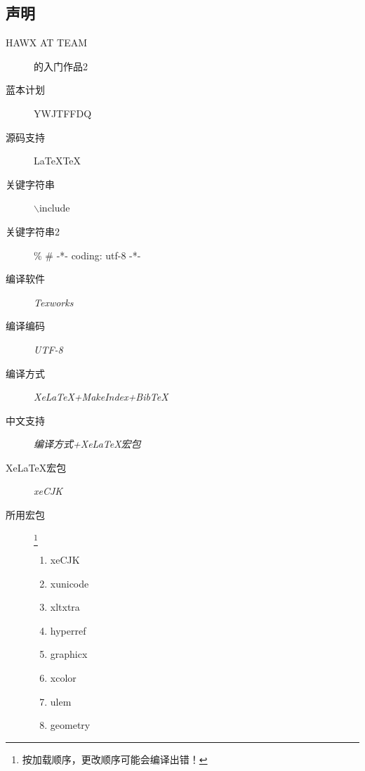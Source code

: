 ﻿%
\subsection{声明}
\begin{description}
\item[HAWX AT TEAM]的入门作品2
\item[蓝本计划]YWJTFFDQ
\item[源码支持]\XeTeX \LaTeXe  \LaTeX  \TeX
\item[关键字符串]$\backslash$include
\item[关键字符串2]\% \# -*- coding: utf-8 -*-
\item[编译软件]\emph{Texworks}
\item[编译编码]\emph{UTF-8}
\item[编译方式]\emph{XeLaTeX+MakeIndex+BibTeX}
\item[中文支持]\emph{编译方式+XeLaTeX宏包}
\item[XeLaTeX宏包]\emph{xeCJK}
\item[所用宏包]\footnote{按加载顺序，更改顺序可能会编译出错！}
\begin{enumerate}
\item xeCJK
\item xunicode
\item xltxtra
\item hyperref
\item graphicx
\item xcolor
\item ulem
\item geometry
\end{enumerate}
\end{description}
